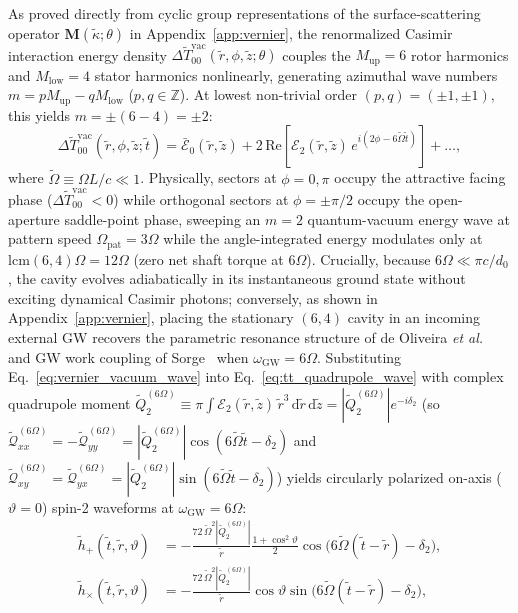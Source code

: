 \documentclass[aps,prd,twocolumn,10pt,showkeys,nofootinbib,floatfix,longbibliography]{revtex4-2}
\newcommand{\dd}{\mathrm{d}}
\begin{document}
As proved directly from cyclic group representations of the surface-scattering operator $\mathbf{M}(\tilde{\kappa}; \theta)$ in Appendix~\ref{app:vernier}, the renormalized Casimir interaction energy density $\Delta\tilde{T}_{00}^{\mathrm{vac}}(\tilde{r}, \phi, \tilde{z}; \theta)$ couples the $M_{\mathrm{up}}=6$ rotor harmonics and $M_{\mathrm{low}}=4$ stator harmonics nonlinearly, generating azimuthal wave numbers $m = p M_{\mathrm{up}} - q M_{\mathrm{low}}$ ($p,q \in \mathbb{Z}$). At lowest non-trivial order $(p,q) = (\pm 1, \pm 1)$, this yields $m = \pm(6 - 4) = \pm 2$:
\begin{equation}
\Delta\tilde{T}_{00}^{\mathrm{vac}}(\tilde{r}, \phi, \tilde{z}; \tilde{t}) = \bar{\mathcal{E}}_0(\tilde{r}, \tilde{z}) + 2\,\mathrm{Re}\!\left[\mathcal{E}_2(\tilde{r}, \tilde{z}) \, e^{i(2\phi - 6\tilde{\Omega}\tilde{t})}\right] + \dots,
\label{eq:vernier_vacuum_wave}
\end{equation}
where $\tilde{\Omega} \equiv \Omega L / c \ll 1$. Physically, sectors at $\phi = 0, \pi$ occupy the attractive facing phase ($\Delta\tilde{T}_{00}^{\mathrm{vac}} < 0$) while orthogonal sectors at $\phi = \pm\pi/2$ occupy the open-aperture saddle-point phase, sweeping an $m=2$ quantum-vacuum energy wave at pattern speed $\Omega_{\mathrm{pat}} = 3\Omega$ while the angle-integrated energy modulates only at $\mathrm{lcm}(6,4)\Omega = 12\Omega$ (zero net shaft torque at $6\Omega$). Crucially, because $6\Omega \ll \pi c / d_0$, the cavity evolves adiabatically in its instantaneous ground state without exciting dynamical Casimir photons; conversely, as shown in Appendix~\ref{app:vernier}, placing the stationary $(6,4)$ cavity in an incoming external GW recovers the parametric resonance structure of de Oliveira \emph{et al.}~\cite{deoliveira2026entropy} and GW work coupling of Sorge~\cite{sorge2023memory} when $\omega_{\mathrm{GW}} = 6\Omega$. Substituting Eq.~\eqref{eq:vernier_vacuum_wave} into Eq.~\eqref{eq:tt_quadrupole_wave} with complex quadrupole moment $\tilde{Q}_2^{(6\Omega)} \equiv \pi\int \mathcal{E}_2(\tilde{r},\tilde{z})\,\tilde{r}^3\,\dd\tilde{r}\,\dd\tilde{z} = |\tilde{Q}_2^{(6\Omega)}|e^{-i\delta_2}$ (so $\tilde{\mathcal{Q}}_{xx}^{(6\Omega)} = -\tilde{\mathcal{Q}}_{yy}^{(6\Omega)} = |\tilde{Q}_2^{(6\Omega)}|\cos(6\tilde{\Omega}\tilde{t}-\delta_2)$ and $\tilde{\mathcal{Q}}_{xy}^{(6\Omega)} = \tilde{\mathcal{Q}}_{yx}^{(6\Omega)} = |\tilde{Q}_2^{(6\Omega)}|\sin(6\tilde{\Omega}\tilde{t}-\delta_2)$) yields circularly polarized on-axis ($\vartheta = 0$) spin-2 waveforms at $\omega_{\mathrm{GW}} = 6\Omega$:
\begin{align}
\tilde{h}_+(\tilde{t}, \tilde{r}, \vartheta) &= -\frac{72\,\tilde{\Omega}^2 |\tilde{Q}_2^{(6\Omega)}|}{\tilde{r}} \frac{1 + \cos^2\vartheta}{2} \cos\bigl(6\tilde{\Omega}(\tilde{t}-\tilde{r}) - \delta_2\bigr), \nonumber\\
\tilde{h}_\times(\tilde{t}, \tilde{r}, \vartheta) &= -\frac{72\,\tilde{\Omega}^2 |\tilde{Q}_2^{(6\Omega)}|}{\tilde{r}} \cos\vartheta \sin\bigl(6\tilde{\Omega}(\tilde{t}-\tilde{r}) - \delta_2\bigr),
\label{eq:vernier_hplus_hcross}
\end{align}
\end{document}
